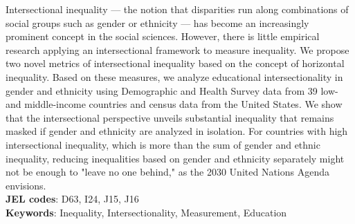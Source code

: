  \noindent Intersectional inequality --- the notion that disparities run along combinations of social groups such as gender or ethnicity --- has become an increasingly prominent concept in the social sciences. However, there is little empirical research applying an intersectional framework to measure inequality. We propose two novel metrics of intersectional inequality based on the concept of horizontal inequality. Based on these measures, we analyze educational intersectionality in gender and ethnicity using Demographic and Health Survey data from 39 low- and middle-income countries and census data from the United States. We show that the intersectional perspective unveils substantial inequality that remains masked if gender and ethnicity are analyzed in isolation. For countries with high intersectional inequality, which is more than the sum of gender and ethnic inequality, reducing inequalities based on gender and ethnicity separately might not be enough to "leave no one behind," as the 2030 United Nations Agenda envisions.  \\
  
  \noindent \textbf{JEL codes}: D63, I24, J15, J16  \\
  \noindent \textbf{Keywords}: Inequality, Intersectionality, Measurement, Education  \\
